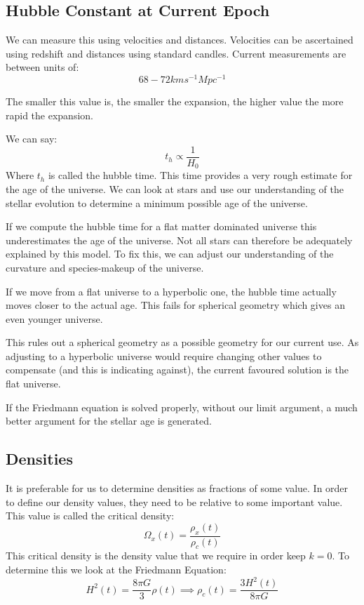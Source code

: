 \subsection{Hubble Constant at Current Epoch}

We can measure this using velocities and distances. Velocities can be ascertained using redshift and distances using standard candles. Current measurements are between units of:
\[
    68-72 \si{km s^{-1} Mpc^{-1}}
\]

The smaller this value is, the smaller the expansion, the higher value the more rapid the expansion.

We can say:
\[
    t_h \propto \frac{1}{H_0}
\]
Where $t_h$ is called the hubble time. This time provides a very rough estimate for the age of the universe. We can look at stars and use our understanding of the stellar evolution to determine a minimum possible age of the universe. 

If we compute the hubble time for a flat matter dominated universe this underestimates the age of the universe. Not all stars can therefore be adequately explained by this model. To fix this, we can adjust our understanding of the curvature and species-makeup of the universe. 

If we move from a flat universe to a hyperbolic one, the hubble time actually moves closer to the actual age. This fails for spherical geometry which gives an even younger universe.

This rules out a spherical geometry as a possible geometry for our current use. As adjusting to a hyperbolic universe would require changing other values to compensate (and this is indicating against), the current favoured solution is the flat universe.

If the Friedmann equation is solved properly, without our limit argument, a much better argument for the stellar age is generated.

\subsection{Densities}

It is preferable for us to determine densities as fractions of some value. In order to define our density values, they need to be relative to some important value. This value is called the critical density:
\[
    \Omega_x(t) = \frac{\rho_x(t)}{\rho_c(t)}
\]
This critical density is the density value that we require in order keep $k=0$. To determine this we look at the Friedmann Equation:
\[
    H^2(t) = \frac{8 \pi G}{3}\rho(t) \implies \boxed{\rho_c(t) = \frac{3 H^2 (t)}{8 \pi G}}
\]


